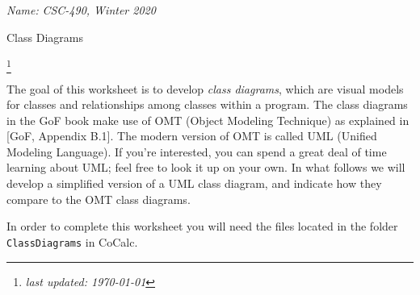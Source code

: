\documentclass[11pt]{article}
\newlength{\up}\setlength{\up}{-\baselineskip}
\newcommand\blfootnote[1]{%
  \begingroup
  \renewcommand\thefootnote{}\footnote{#1}%
  \addtocounter{footnote}{-1}%
  \endgroup
}
\begin{document}
\noindent\emph{Name:}
\hfill
\emph{CSC-490, Winter 2020}

\begin{center}
  {\huge Class Diagrams}
\end{center}
\blfootnote{\emph{last updated: \today}}

\medskip


The goal of this worksheet is to develop \emph{class diagrams}, which are visual models for classes and relationships among classes within a program. The class diagrams in the GoF book make use of OMT (Object Modeling Technique) as explained in [GoF, Appendix B.1]. The modern version of OMT is called UML (Unified Modeling Language). If you're interested, you can spend a great deal of time learning about UML; feel free to look it up on your own. In what follows we will develop a simplified version of a UML class diagram, and indicate how they compare to the OMT class diagrams.

In order to complete this worksheet you will need the files located in the folder \texttt{ClassDiagrams} in CoCalc.
\end{document}
